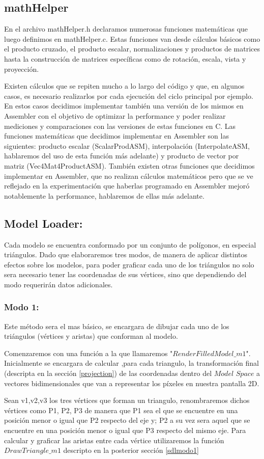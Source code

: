 \documentclass[a4paper]{article}
\begin{document}
\subsection{mathHelper}
En el archivo mathHelper.h declaramos numerosas funciones matemáticas que luego definimos en mathHelper.c. Estas funciones van desde cálculos básicos como el producto cruzado, el producto escalar, normalizaciones y productos de matrices hasta la construcción de matrices específicas como de rotación, escala, vista y proyección.
\par Existen cálculos que se repiten mucho a lo largo del código y que, en algunos casos, es necesario realizarlos por cada ejecución del ciclo principal por ejemplo. En estos casos decidimos implementar también una versión de los mismos en Assembler con el objetivo de optimizar la performance y poder realizar mediciones y comparaciones con las versiones de estas funciones en C. Las funciones matemáticas que decidimos implementar en Assembler son las siguientes: producto escalar (ScalarProdASM), interpolación (InterpolateASM, hablaremos del uso de esta función más adelante) y producto de vector por matriz (Vec4Mat4ProductASM). También existen otras funciones que decidimos implementar en Assembler, que no realizan cálculos matemáticos pero que se ve reflejado en la experimentación que haberlas programado en Assembler mejoró notablemente la performance, hablaremos de ellas más adelante.

\subsection{Model Loader:}
Cada modelo se encuentra conformado por un conjunto de polígonos, en especial triángulos. Dado que elaboraremos tres modos, de manera de aplicar distintos efectos sobre los modelos, para poder graficar cada uno de los triángulos no solo sera necesario tener las coordenadas de sus vértices, sino que dependiendo del modo requerirán datos adicionales. 


\subsubsection{Modo 1:}  
Este método sera el mas básico, se encargara de dibujar cada uno de los triángulos (vértices y aristas) que conforman al modelo. 
\par Comenzaremos con una función a la que llamaremos "$RenderFilledModel\_m1$". Inicialmente se encargara de calcular ,para cada triangulo, la transformación final (descripta en la sección \ref{projection}) de las coordenadas dentro del $Model$ $Space$ a vectores bidimensionales que van a representar los píxeles en nuestra pantalla 2D.  
\par Sean v1,v2,v3 los tres vértices que forman un triangulo, renombraremos dichos vértices como P1, P2, P3 de manera que P1 sea el que se encuentre en una posición menor o igual que P2 respecto del eje y;  P2 a su vez sera aquel que se encuentre en una posición menor o igual que P3 respecto del mismo eje. Para calcular y graficar las aristas entre cada vértice utilizaremos la función $DrawTriangle\_m1$ descripto en la posterior sección \ref{sdlmodo1} 
\end{document}
